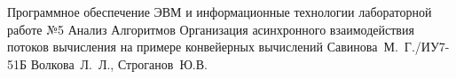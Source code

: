 \documentclass{bmstu}
\begin{document}
	
	{Программное обеспечение ЭВМ и информационные технологии}
	{лабораторной работе №5}
	{Анализ Алгоритмов}
	{Организация асинхронного взаимодействия потоков вычисления на примере конвейерных вычислений}
	{}
	{Савинова~М.~Г./ИУ7-51Б}
	{Волкова~Л.~Л., Строганов~Ю.В.}
	
	\maketableofcontents
	
	
	
	
	
	
	
	
	\makebibliography
	
\end{document}
